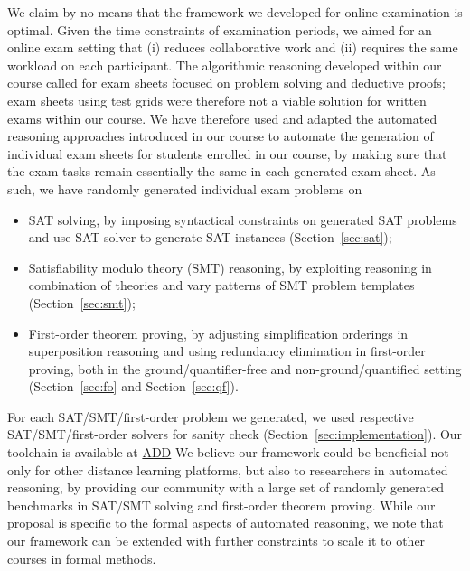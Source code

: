 We claim by no means that the framework we developed for online
examination is optimal.
Given the time constraints of examination periods, we aimed for an
online exam setting that (i) reduces collaborative work and  (ii)
requires the same workload on each participant.
The algorithmic reasoning developed within our
course called for exam sheets focused on problem solving and deductive
proofs;  exam sheets using test grids were therefore not a viable solution
for written exams within our course.
We have therefore used and adapted the automated reasoning approaches introduced in our
course to automate the generation of individual exam sheets for
students enrolled in our course, by making sure that the exam tasks
remain essentially the same in each generated exam sheet. As such, we have randomly generated
individual exam problems on 
\begin{itemize}
\item SAT solving, by imposing syntactical constraints on generated
  SAT problems and use SAT solver to generate SAT instances (Section~\ref{sec:sat}); 
\item Satisfiability modulo theory (SMT) reasoning, by exploiting reasoning in combination of theories
  and vary patterns of SMT problem templates (Section~\ref{sec:smt}); 
\item First-order theorem proving, by adjusting simplification
  orderings in superposition reasoning and using redundancy elimination
  in first-order proving, both in the ground/quantifier-free 
  and non-ground/quantified setting (Section~\ref{sec:fo}
  and Section~\ref{sec:qf}). 
\end{itemize}
For each SAT/SMT/first-order problem we generated, we used respective
SAT/SMT/first-order solvers for sanity check
(Section~\ref{sec:implementation}). Our toolchain is available at \url{ADD}
We believe our framework could be beneficial not only for other
distance learning platforms, but also to researchers in automated
reasoning, by providing our community with a large set of randomly generated benchmarks in SAT/SMT solving and first-order theorem proving.
While our proposal is specific to the formal aspects of automated
reasoning, we note that  our framework can be extended with further
constraints to scale it to other courses in formal methods. 

